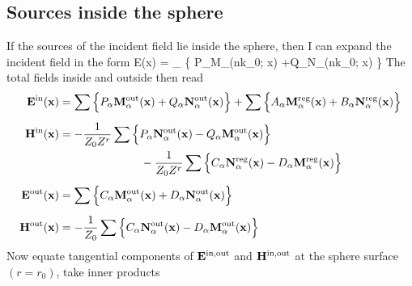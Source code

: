 \documentclass[letterpaper]{article}
\begin{document}
\subsection{Sources inside the sphere}

If the sources of the incident field lie inside the sphere,
then I can expand the incident field in the form
{\vb E(\vb x) =
   \sum_{\alpha}
    \Big\{
        P_\alpha \vb M_\alpha(nk_0; \vb x)
       +Q_\alpha \vb N_\alpha(nk_0; \vb x)
    \Big\}
}
The total fields inside and outside then read 
\begin{align}
 \mathbf{E}^{\text{\scriptsize in}}(\mathbf{x}) 
&=
 \sum\Big\{ 
        P_\alpha \mathbf{M}^{\text{\scriptsize out}}_\alpha(\mathbf{x})
       +Q_\alpha \mathbf{N}^{\text{\scriptsize out}}_\alpha(\mathbf{x})
     \Big\}
 +
 \sum\Big\{ 
        A_\alpha  \mathbf{M}^{\text{\scriptsize reg}}_\alpha(\mathbf{x})
       +B_\alpha  \mathbf{N}^{\text{\scriptsize reg}}_\alpha(\mathbf{x})
     \Big\}
\\[5pt]
 \mathbf{H}^{\text{\scriptsize in}}(\mathbf{x}) 
&=
 -\frac{1}{Z_0 Z^r}
 \sum\Big\{ 
        P_\alpha \mathbf{N}^{\text{\scriptsize out}}_\alpha(\mathbf{x})
       -Q_\alpha \mathbf{M}^{\text{\scriptsize out}}_\alpha(\mathbf{x})
     \Big\} 
\nonumber\\
&\hspace{1in}
 -\frac{1}{Z_0 Z^r}
 \sum\Big\{ 
        C_\alpha \mathbf{N}^{\text{\scriptsize reg}}_\alpha(\mathbf{x})
       -D_\alpha \mathbf{M}^{\text{\scriptsize reg}}_\alpha(\mathbf{x})
     \Big\}
\\[5pt]
\mathbf{E}^{\text{\scriptsize out}}(\mathbf{x}) 
 &= 
 \sum\Big\{ 
        C_\alpha \mathbf{M}^{\text{\scriptsize out}}_\alpha(\mathbf{x})
       +D_\alpha \mathbf{N}^{\text{\scriptsize out}}_\alpha(\mathbf{x})
     \Big\}
\label{EOutExpansion}\\[5pt]
 \mathbf{H}^{\text{\scriptsize out}}(\mathbf{x}) 
 &=-\frac{1}{Z_0}
 \sum\Big\{ 
        C_\alpha \mathbf{N}^{\text{\scriptsize out}}_\alpha(\mathbf{x})
       -D_\alpha \mathbf{M}^{\text{\scriptsize out}}_\alpha(\mathbf{x})
     \Big\}
\label{HOutExpansion}
\end{align}
Now equate tangential components of $\mathbf{E}^{\text{\scriptsize in,out}}$ and 
$\mathbf{H}^{\text{\scriptsize in,out}}$ at the sphere surface $(r=r_0)$, take inner products
\end{document}

